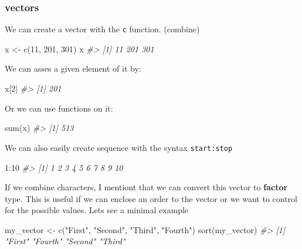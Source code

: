 \documentclass[
]{article}
\newenvironment{Shaded}{\begin{snugshade}}{\end{snugshade}}
\newcommand{\CommentTok}[1]{\textcolor[rgb]{0.56,0.35,0.01}{\textit{#1}}}
\newcommand{\DecValTok}[1]{\textcolor[rgb]{0.00,0.00,0.81}{#1}}
\newcommand{\FunctionTok}[1]{\textcolor[rgb]{0.00,0.00,0.00}{#1}}
\newcommand{\NormalTok}[1]{#1}
\newcommand{\OtherTok}[1]{\textcolor[rgb]{0.56,0.35,0.01}{#1}}
\newcommand{\SpecialCharTok}[1]{\textcolor[rgb]{0.00,0.00,0.00}{#1}}
\newcommand{\StringTok}[1]{\textcolor[rgb]{0.31,0.60,0.02}{#1}}
\begin{document}
\hypertarget{vectors}{%
\subsubsection{vectors}\label{vectors}}

We can create a vector with the \texttt{c} function. (combine)

\begin{Shaded}
\begin{Highlighting}[]
\NormalTok{x }\OtherTok{\textless{}{-}} \FunctionTok{c}\NormalTok{(}\DecValTok{11}\NormalTok{, }\DecValTok{201}\NormalTok{, }\DecValTok{301}\NormalTok{)}
\NormalTok{x}
\CommentTok{\#\textgreater{} [1]  11 201 301}
\end{Highlighting}
\end{Shaded}

We can asses a given element of it by:

\begin{Shaded}
\begin{Highlighting}[]
\NormalTok{x[}\DecValTok{2}\NormalTok{]}
\CommentTok{\#\textgreater{} [1] 201}
\end{Highlighting}
\end{Shaded}

Or we can use functions on it:

\begin{Shaded}
\begin{Highlighting}[]
\FunctionTok{sum}\NormalTok{(x)}
\CommentTok{\#\textgreater{} [1] 513}
\end{Highlighting}
\end{Shaded}

We can also easily create sequence with the syntax \texttt{start:stop}

\begin{Shaded}
\begin{Highlighting}[]
\DecValTok{1}\SpecialCharTok{:}\DecValTok{10}
\CommentTok{\#\textgreater{}  [1]  1  2  3  4  5  6  7  8  9 10}
\end{Highlighting}
\end{Shaded}

If we combine characters, I mentiont that we can convert this vector to \textbf{factor} type. This is useful if we can enclose an order to the vector or we want to control for the possible values.
Lets see a minimal example

\begin{Shaded}
\begin{Highlighting}[]
\NormalTok{my\_vector }\OtherTok{\textless{}{-}} \FunctionTok{c}\NormalTok{(}\StringTok{"First"}\NormalTok{, }\StringTok{"Second"}\NormalTok{, }\StringTok{"Third"}\NormalTok{, }\StringTok{"Fourth"}\NormalTok{)}
\FunctionTok{sort}\NormalTok{(my\_vector)}
\CommentTok{\#\textgreater{} [1] "First"  "Fourth" "Second" "Third"}
\end{Highlighting}
\end{Shaded}
\end{document}
